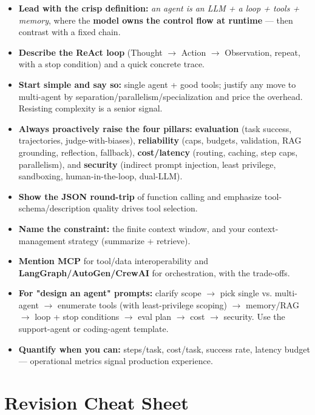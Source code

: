 \documentclass[11pt]{article}
\providecommand{\tightlist}{\setlength{\itemsep}{1pt}\setlength{\parskip}{0pt}}
\begin{document}
\begin{itemize}
\tightlist
\item
  \textbf{Lead with the crisp definition:} \emph{an agent is an LLM + a loop + tools + memory}, where the \textbf{model owns the control flow at runtime} --- then contrast with a fixed chain.
\item
  \textbf{Describe the ReAct loop} (Thought \(\rightarrow\) Action \(\rightarrow\) Observation, repeat, with a stop condition) and a quick concrete trace.
\item
  \textbf{Start simple and say so:} single agent + good tools; justify any move to multi-agent by separation/parallelism/specialization and price the overhead. Resisting complexity is a senior signal.
\item
  \textbf{Always proactively raise the four pillars:} \textbf{evaluation} (task success, trajectories, judge-with-biases), \textbf{reliability} (caps, budgets, validation, RAG grounding, reflection, fallback), \textbf{cost/latency} (routing, caching, step caps, parallelism), and \textbf{security} (indirect prompt injection, least privilege, sandboxing, human-in-the-loop, dual-LLM).
\item
  \textbf{Show the JSON round-trip} of function calling and emphasize tool-schema/description quality drives tool selection.
\item
  \textbf{Name the constraint:} the finite context window, and your context-management strategy (summarize + retrieve).
\item
  \textbf{Mention MCP} for tool/data interoperability and \textbf{LangGraph/AutoGen/CrewAI} for orchestration, with the trade-offs.
\item
  \textbf{For "design an agent" prompts:} clarify scope \(\rightarrow\) pick single vs. multi-agent \(\rightarrow\) enumerate tools (with least-privilege scoping) \(\rightarrow\) memory/RAG \(\rightarrow\) loop + stop conditions \(\rightarrow\) eval plan \(\rightarrow\) cost \(\rightarrow\) security. Use the support-agent or coding-agent template.
\item
  \textbf{Quantify when you can:} steps/task, cost/task, success rate, latency budget --- operational metrics signal production experience.
\end{itemize}

\section{Revision Cheat Sheet}\label{revision-cheat-sheet}
\end{document}
